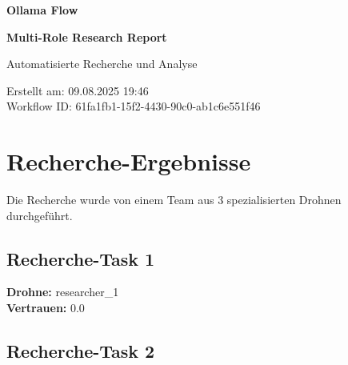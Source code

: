 \documentclass[12pt,a4paper]{article}
\begin{document}
\begin{titlepage}
    \centering
    
    \vspace*{2cm}
    
    {\Huge\bfseries Ollama Flow}
    
    {\Huge\bfseries Multi-Role Research Report}
    
    \vspace{2cm}
    
    {\Large Automatisierte Recherche und Analyse}
    
    \vspace{3cm}
    
    
    \vspace{2cm}
    
    
    \vfill
    
    {\large
    Erstellt am: 09.08.2025 19:46\\
    Workflow ID: 61fa1fb1-15f2-4430-90c0-ab1c6e551f46
    }
    
\end{titlepage}

\newpage
\tableofcontents
\newpage

\section{Recherche-Ergebnisse}

Die Recherche wurde von einem Team aus 3 spezialisierten Drohnen durchgeführt.

\subsection{Recherche-Task 1}

\textbf{Drohne:} researcher\_1\\
\textbf{Vertrauen:} 0.0%

\subsection{Recherche-Task 2}
\end{document}
